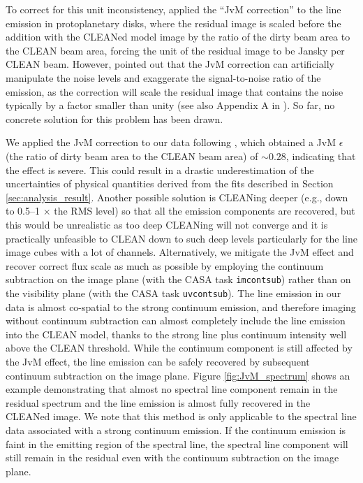 \documentclass[linenumbers, twocolumn, twocolappendix, astrosymb, times]{aastex631}
\begin{document}
To correct for this unit inconsistency, \citet{Czekala2021} applied the ``JvM correction'' to the line emission in protoplanetary disks, where the residual image is scaled before the addition with the CLEANed model image by the ratio of the dirty beam area to the CLEAN beam area, forcing the unit of the residual image to be Jansky per CLEAN beam. However, \citet{Casassus2022} pointed out that the JvM correction can artificially manipulate the noise levels and exaggerate the signal-to-noise ratio of the emission, as the correction will scale the residual image that contains the noise typically by a factor smaller than unity (see also Appendix A in \citealt{Casassus2023}). So far, no concrete solution for this problem has been drawn.

We applied the JvM correction to our data following \citet{Czekala2021}, which obtained a JvM $\epsilon$ (the ratio of dirty beam area to the CLEAN beam area) of $\sim0.28$, indicating that the effect is severe. This could result in a drastic underestimation of the uncertainties of physical quantities derived from the fits described in Section \ref{sec:analysis_result}. Another possible solution is CLEANing deeper (e.g., down to 0.5--1 $\times$ the RMS level) so that all the emission components are recovered, but this would be unrealistic as too deep CLEANing will not converge and it is practically unfeasible to CLEAN down to such deep levels particularly for the line image cubes with a lot of channels. Alternatively, we mitigate the JvM effect and recover correct flux scale as much as possible by employing the continuum subtraction on the image plane (with the CASA task \texttt{imcontsub}) rather than on the visibility plane (with the CASA task \texttt{uvcontsub}). The line emission in our data is almost co-spatial to the strong continuum emission, and therefore imaging without continuum subtraction can almost completely include the line emission into the CLEAN model, thanks to the strong line plus continuum intensity well above the CLEAN threshold. While the continuum component is still affected by the JvM effect, the line emission can be safely recovered by subsequent continuum subtraction on the image plane. Figure \ref{fig:JvM_spectrum} shows an example demonstrating that almost no spectral line component remain in the residual spectrum and the line emission is almost fully recovered in the CLEANed image. We note that this method is only applicable to the spectral line data associated with a strong continuum emission. If the continuum emission is faint in the emitting region of the spectral line, the spectral line component will still remain in the residual even with the continuum subtraction on the image plane. 
\end{document}
